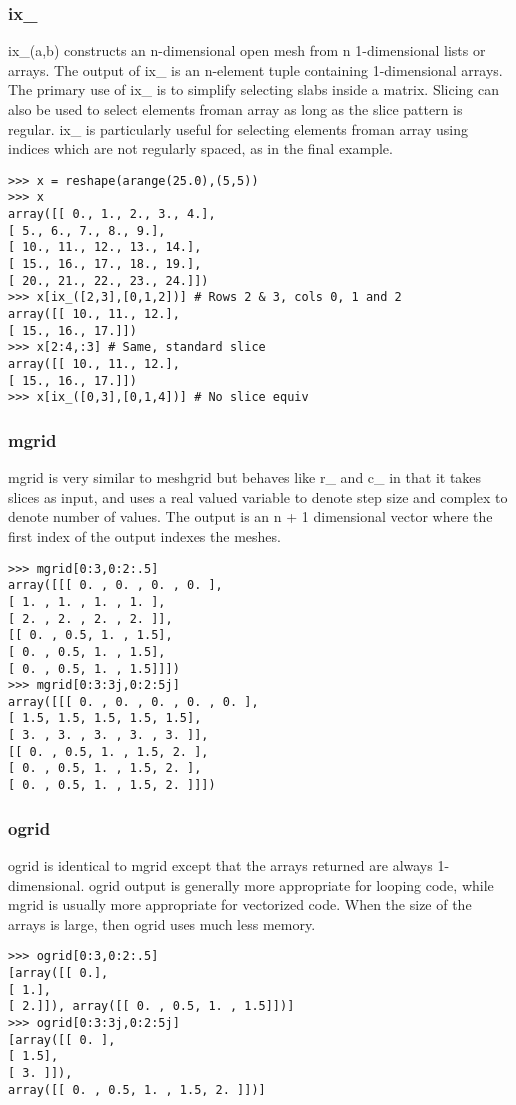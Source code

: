 \documentclass[KSmain.tex]{subfiles}
\begin{document}
\subsubsection{ix\_}
ix\_(a,b) constructs an n-dimensional open mesh from n 1-dimensional lists or arrays. The output of
ix\_ is an n-element tuple containing 1-dimensional arrays. The primary use of ix\_ is to simplify selecting
slabs inside a matrix. Slicing can also be used to select elements froman array as long as the slice pattern is
regular. ix\_ is particularly useful for selecting elements froman array using indices which are not regularly
spaced, as in the final example.
\begin{framed}
\begin{verbatim}
>>> x = reshape(arange(25.0),(5,5))
>>> x
array([[ 0., 1., 2., 3., 4.],
[ 5., 6., 7., 8., 9.],
[ 10., 11., 12., 13., 14.],
[ 15., 16., 17., 18., 19.],
[ 20., 21., 22., 23., 24.]])
>>> x[ix_([2,3],[0,1,2])] # Rows 2 & 3, cols 0, 1 and 2
array([[ 10., 11., 12.],
[ 15., 16., 17.]])
>>> x[2:4,:3] # Same, standard slice
array([[ 10., 11., 12.],
[ 15., 16., 17.]])
>>> x[ix_([0,3],[0,1,4])] # No slice equiv
\end{verbatim}
\end{framed}
\subsubsection{mgrid}
mgrid is very similar to meshgrid but behaves like r\_ and c\_ in that it takes slices as input, and uses a
real valued variable to denote step size and complex to denote number of values. The output is an n + 1
dimensional vector where the first index of the output indexes the meshes.
\begin{framed}
\begin{verbatim}
>>> mgrid[0:3,0:2:.5]
array([[[ 0. , 0. , 0. , 0. ],
[ 1. , 1. , 1. , 1. ],
[ 2. , 2. , 2. , 2. ]],
[[ 0. , 0.5, 1. , 1.5],
[ 0. , 0.5, 1. , 1.5],
[ 0. , 0.5, 1. , 1.5]]])
>>> mgrid[0:3:3j,0:2:5j]
array([[[ 0. , 0. , 0. , 0. , 0. ],
[ 1.5, 1.5, 1.5, 1.5, 1.5],
[ 3. , 3. , 3. , 3. , 3. ]],
[[ 0. , 0.5, 1. , 1.5, 2. ],
[ 0. , 0.5, 1. , 1.5, 2. ],
[ 0. , 0.5, 1. , 1.5, 2. ]]])
\end{verbatim}
\end{framed}

\subsubsection{ogrid}
ogrid is identical to mgrid except that the arrays returned are always 1-dimensional. ogrid output is generally
more appropriate for looping code, while mgrid is usually more appropriate for vectorized code.
When the size of the arrays is large, then ogrid uses much less memory.
\begin{framed}
\begin{verbatim}
>>> ogrid[0:3,0:2:.5]
[array([[ 0.],
[ 1.],
[ 2.]]), array([[ 0. , 0.5, 1. , 1.5]])]
>>> ogrid[0:3:3j,0:2:5j]
[array([[ 0. ],
[ 1.5],
[ 3. ]]),
array([[ 0. , 0.5, 1. , 1.5, 2. ]])]
\end{verbatim}
\end{framed}
\end{document}
